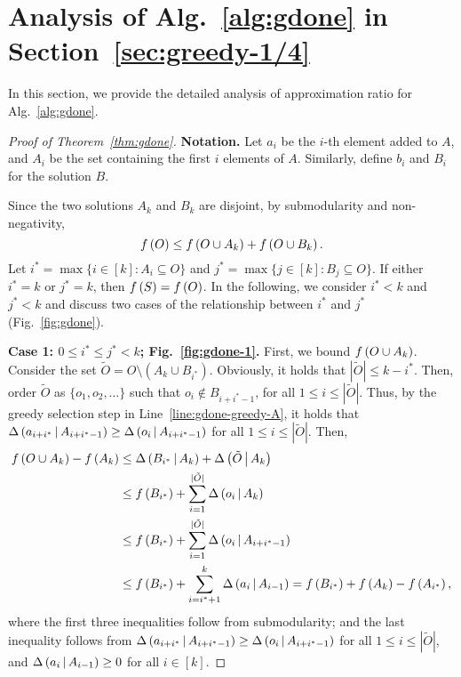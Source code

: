 \section{Analysis of Alg.~\ref{alg:gdone} in Section~\ref{sec:greedy-1/4}}
\label{apx:greedy-1/4}
In this section, we provide the detailed analysis of approximation ratio
for Alg.~\ref{alg:gdone}.
\thmgdone*
\begin{proof}[Proof of Theorem~\ref{thm:gdone}]

\textbf{Notation.}
Let $a_i$ be the $i$-th element added to $A$,
and $A_i$ be the set containing the first $i$ elements of $A$.
Similarly, define $b_i$ and $B_i$ for the solution $B$.

Since the two solutions $A_k$ and $B_k$ are disjoint, by submodularity and non-negativity,
\begin{equation*}
f \left( O \right) \le f \left( O\cup A_k \right) + f \left( O\cup B_k \right).
\end{equation*}
Let $i^* = \max\{i \in [k]: A_i\subseteq O\}$
and $j^* = \max\{j \in [k]: B_j\subseteq O\}$.
If either $i^* = k$ or $j^* = k$,
then $f \left( S \right) = f \left( O \right)$.
In the following, we consider $i^* < k$ and $j^* < k$
and discuss two cases of the relationship between $i^*$ and $j^*$ (Fig.~\ref{fig:gdone}).



\textbf{Case 1: $0\le i^*\le j^* < k$; Fig.~\ref{fig:gdone-1}.}
First, we bound $f \left( O\cup A_k \right)$. 
Consider the set $\tilde{O} = O\setminus \left(A_k \cup B_{i^*}\right)$.
Obviously, it holds that $|\tilde{O}|\le k-i^*$.
Then, order $\tilde{O}$ as $\{o_1, o_2, \ldots\}$ such that $o_i \not \in B_{i+i^*-1}$,
for all $1\le i \le |\tilde{O}|$.
Thus, by the greedy selection step in Line~\ref{line:gdone-greedy-A},
it holds that $\Delta \left( a_{i+i^*} \, \middle| \, A_{i+i^*-1} \right)\ge \Delta \left( o_i \, \middle| \, A_{i+i^*-1} \right)$
for all $1\le i \le |\tilde{O}|$.
Then,
\begin{align*}
f \left( O\cup A_k \right) - f \left( A_k \right) &\le \Delta \left( B_{i^*} \, \middle| \, A_k \right) + \Delta \left( \tilde{O} \, \middle| \, A_k \right)\\
&\le f \left( B_{i^*} \right) + \sum\limits_{i=1}^{|\tilde{O}|} \Delta \left( o_i \, \middle| \, A_k \right)\\
&\le f \left( B_{i^*} \right) + \sum\limits_{i=1}^{|\tilde{O}|} \Delta \left( o_i \, \middle| \, A_{i+i^*-1} \right)\\
&\le f \left( B_{i^*} \right) + \sum\limits_{i=i^*+1}^{k} \Delta \left( a_i \, \middle| \, A_{i-1} \right)
= f \left( B_{i^*} \right) + f \left( A_k \right) - f \left( A_{i^*} \right),
\end{align*}
where the first three inequalities follow from submodularity;
and the last inequality follows from 
$\Delta \left( a_{i+i^*} \, \middle| \, A_{i+i^*-1} \right)\ge \Delta \left( o_i \, \middle| \, A_{i+i^*-1} \right)$
for all $1\le i \le |\tilde{O}|$,
and $\Delta \left( a_i \, \middle| \, A_{i-1} \right)\ge 0$ for all $i \in [k]$.


\end{proof}
